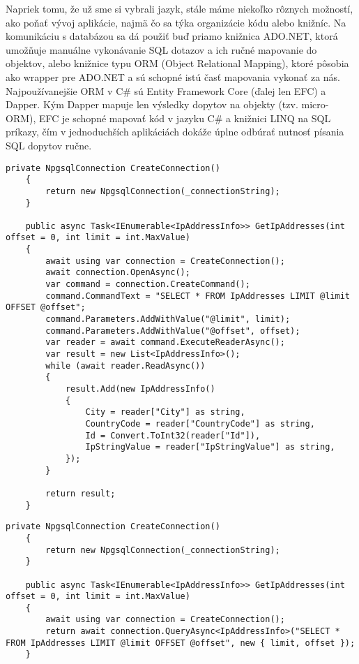 Napriek tomu, že už sme si vybrali jazyk, stále máme niekoľko rôznych možností, ako poňať vývoj aplikácie, najmä čo sa týka organizácie kódu 
alebo knižníc. Na komunikáciu s databázou sa dá použiť buď priamo knižnica ADO.NET, ktorá umožňuje manuálne vykonávanie SQL dotazov a ich ručné 
mapovanie do objektov, alebo knižnice typu ORM (Object Relational Mapping), ktoré pôsobia ako wrapper pre ADO.NET a sú schopné istú časť mapovania 
vykonať za nás. Najpoužívanejšie ORM v C\# sú Entity Framework Core (ďalej len EFC) a Dapper. Kým Dapper mapuje len výsledky dopytov na objekty (tzv. micro-ORM), 
EFC je schopné mapovať kód v jazyku C\# a knižnici LINQ na SQL príkazy, čím v jednoduchších aplikáciách dokáže úplne odbúrať nutnosť písania 
SQL dopytov ručne.

\begin{lstlisting}[float,language={[Sharp]C},caption={Ukážka kódu pre ten istý dopyt pomocou rôznych knižníc - ADO.NET},label=alg:Ukazka_ADO]
    private NpgsqlConnection CreateConnection()
    {
        return new NpgsqlConnection(_connectionString);
    }

    public async Task<IEnumerable<IpAddressInfo>> GetIpAddresses(int offset = 0, int limit = int.MaxValue)
    {
        await using var connection = CreateConnection();
        await connection.OpenAsync();
        var command = connection.CreateCommand();
        command.CommandText = "SELECT * FROM IpAddresses LIMIT @limit OFFSET @offset";
        command.Parameters.AddWithValue("@limit", limit);
        command.Parameters.AddWithValue("@offset", offset);
        var reader = await command.ExecuteReaderAsync();
        var result = new List<IpAddressInfo>();
        while (await reader.ReadAsync())
        {
            result.Add(new IpAddressInfo()
            {
                City = reader["City"] as string,
                CountryCode = reader["CountryCode"] as string,
                Id = Convert.ToInt32(reader["Id"]),
                IpStringValue = reader["IpStringValue"] as string,
            });
        }

        return result;
    }
\end{lstlisting}
\begin{lstlisting}[float,language={[Sharp]C},caption={Ukážka kódu pre ten istý dopyt pomocou rôznych knižníc - Dapper},label=alg:Ukazka_Dapper]
    private NpgsqlConnection CreateConnection()
    {
        return new NpgsqlConnection(_connectionString);
    }

    public async Task<IEnumerable<IpAddressInfo>> GetIpAddresses(int offset = 0, int limit = int.MaxValue)
    {
        await using var connection = CreateConnection();
        return await connection.QueryAsync<IpAddressInfo>("SELECT * FROM IpAddresses LIMIT @limit OFFSET @offset", new { limit, offset });
    }
\end{lstlisting}
